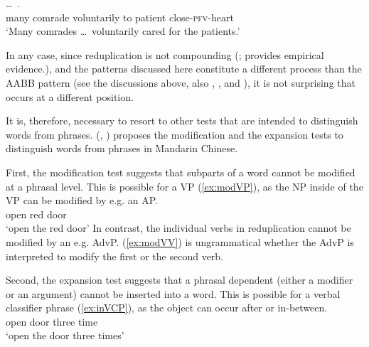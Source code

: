 \ea\label{ex:guanxin}%
\gll {}  \ldots\,    .\\
many comrade {} voluntarily to patient close-\textsc{pfv}-heart\\
\glt `Many comrades \ldots\, voluntarily cared for the patients.'
\z

In any case, since reduplication is not compounding (\citealt[149--150]{Sui2018}; \citealt{GaoEtAl2021} provides empirical evidence.),
and the patterns discussed here constitute a different process than the AABB pattern
(see the discussions above, also \citealt[Sec. 4.3]{Deng2013}, \citealt[Sec. 2]{SuiHu2016}, \citealt{Sui2018} and \citealt{Wang2023}),
it is not surprising that  occurs at a different position.

It is, therefore, necessary to resort to other tests that are intended to distinguish words from phrases. 
 \citeauthor{Dai1992} (\citeyear[32--33]{Dai1992}, \citeyear[117--120]{Dai1998}) proposes the modification and the expansion tests to distinguish words from phrases in Mandarin Chinese.

First, the modification test suggests that subparts of a word cannot be modified at a phrasal level.
This is possible for a VP (\ref{ex:modVP}), as the NP inside of the VP can be modified by e.g. an AP.
\ea\label{ex:modVP} %
\gll {}  \\
open  red door\\
\glt `open the red door'
\z
In contrast, the individual verbs in reduplication cannot be modified by an e.g. AdvP.
(\ref{ex:modVV}) is ungrammatical whether the AdvP is interpreted to modify the first or the second verb.
\z


Second, the expansion test suggests that a phrasal dependent (either a modifier or an argument) cannot be inserted into a word.
This is possible for a verbal classifier phrase (\ref{ex:inVCP}), as the object can occur after or in-between.
\ea\label{ex:inVCP}%
\ea \gll {}   \\
open door three time\\
\glt `open the door three times'

